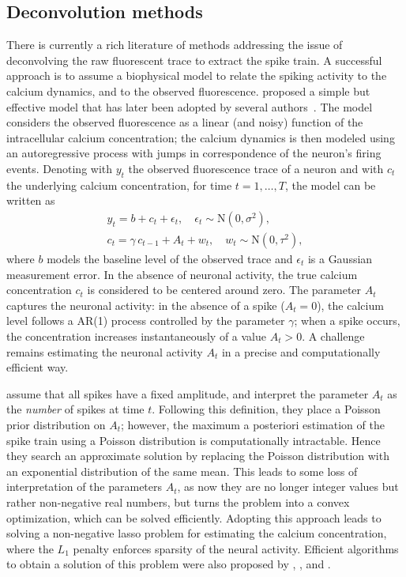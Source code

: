\subsection{Deconvolution methods}

There is currently a rich literature of methods addressing the issue of deconvolving the raw fluorescent trace to extract the spike train. A successful approach is to assume a biophysical model to relate the spiking activity to the calcium dynamics, and to the observed fluorescence. \citet{vogelstein2010} proposed a simple but effective model that has later been adopted by several authors~\citep{pnevmatikakis2016, friedrich2016, friedrich2017, jewell2018, jewell2019}. The model considers the observed fluorescence as a linear (and noisy) function of the intracellular calcium concentration; the calcium dynamics is then modeled using an autoregressive process with jumps in correspondence of the neuron's firing events.
Denoting with $y_t$ the observed fluorescence trace of a neuron and with $c_t$ the underlying calcium concentration, for time $t=1,\dots,T$, the model can be written as
\begin{equation}
\begin{gathered}
y_t = b + c_t + \epsilon_t,\quad \epsilon_t \sim \mathrm{N}(0,\sigma^2),  \\
c_t = \gamma\, c_{t-1} + A_t + w_t, \quad w_t \sim \mathrm{N}(0, \tau^2),
\end{gathered}
\label{eq:ch1_armodel}
\end{equation}
where $b$ models the baseline level of the observed trace and $\epsilon_t$ is a Gaussian measurement error. In the absence of neuronal activity, the true calcium concentration $c_t$ is considered to be centered around zero. The parameter $A_t$ captures the neuronal activity: in the absence of a spike ($A_t = 0$), the calcium level follows a AR(1) process controlled by the parameter $\gamma$; when a spike occurs, the concentration increases instantaneously of a value $A_t > 0$.
A challenge remains estimating the neuronal activity $A_t$ in a precise and computationally efficient way.

\citet{vogelstein2010} assume that all spikes have a fixed amplitude, and interpret the parameter $A_t$ as the \textit{number} of spikes at time $t$. Following this definition, they place a Poisson prior distribution on $A_t$; however, the maximum a posteriori estimation of the spike train using a Poisson distribution is computationally intractable. Hence they search an approximate solution by replacing the Poisson distribution with an exponential distribution of the same mean. This leads to some loss of interpretation of the parameters $A_t$, as now they are no longer integer values but rather non-negative real numbers, but turns the problem into a convex optimization, which can be solved efficiently.
Adopting this approach leads to solving a non-negative lasso problem for estimating the calcium concentration, where the $L_1$ penalty enforces sparsity of the neural activity.
Efficient algorithms to obtain a solution of this problem were also proposed by \citet{pnevmatikakis2016}, \citet{friedrich2016}, and \citet{friedrich2017}.


